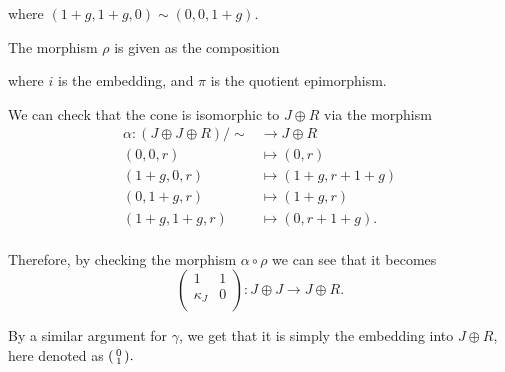 \begin{example}
\begin{center}
	\end{center}
	where \( (1 + g, 1 + g, 0) \sim (0, 0, 1 + g) \).

	The morphism \( \rho \) is given as the composition
	\begin{center}
	\end{center}
	where \( i \) is the embedding, and \( \pi \) is the quotient epimorphism.

	We can check that the cone is isomorphic to \( J \oplus R \) via the morphism
	\begin{align*}
		\alpha: (J \oplus J \oplus R)/\sim &\to J \oplus R \\
		(0, 0, r) &\mapsto (0, r) \\
		(1 + g, 0, r) &\mapsto (1 + g, r + 1 + g) \\
		(0, 1 + g, r) &\mapsto (1 + g, r) \\
		(1 + g, 1 + g, r) &\mapsto (0, r + 1 + g). \\
	\end{align*}

	Therefore, by checking the morphism \( \alpha \circ \rho \) we can see that it becomes
	\[
		\begin{pmatrix}
			1 & 1 \\
			\kappa_J & 0 \\
		\end{pmatrix}
		: J \oplus J \to J \oplus R.
	\]

	By a similar argument for \( \gamma \), we get that it is simply the embedding into \( J \oplus R \), here denoted as \( \begin{psmallmatrix} 0 \\ 1 \\ \end{psmallmatrix}. \)


\end{example}
